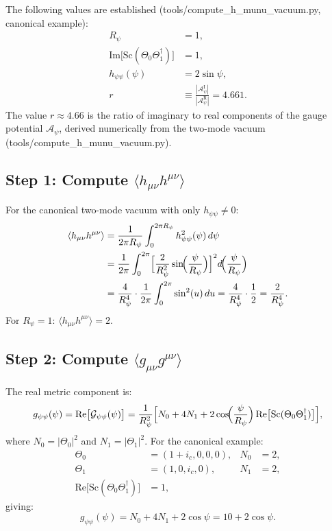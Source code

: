 \documentclass[11pt,a4paper]{article}
\theoremstyle{remark}
\begin{document}
The following values are established (tools/compute\_h\_munu\_vacuum.py, canonical example):
\begin{align}
  R_\psi &= 1, \label{eq:Rpsi_value}\\
  \mathrm{Im}\bigl[\mathrm{Sc}(\Theta_0\Theta_1^\dagger)\bigr] &= 1, \label{eq:sc_im_value}\\
  h_{\psi\psi}(\psi) &= 2\sin\psi, \label{eq:h_canonical}\\
  r &\equiv \frac{|\mathcal{A}^\mathrm{I}_\psi|}{|\mathcal{A}^\mathrm{R}_\psi|} = 4.661. \label{eq:r_value}
\end{align}
The value $r \approx 4.66$ is the ratio of imaginary to real components of the gauge potential
$\mathcal{A}_\psi$, derived numerically from the two-mode vacuum (tools/compute\_h\_munu\_vacuum.py).

\subsection{Step 1: Compute \texorpdfstring{$\langle h_{\mu\nu}h^{\mu\nu}\rangle$}{<h h>}}

For the canonical two-mode vacuum with only $h_{\psi\psi} \neq 0$:
\begin{align}
  \langle h_{\mu\nu}h^{\mu\nu}\rangle
    &= \frac{1}{2\pi R_\psi}\int_0^{2\pi R_\psi}
       h_{\psi\psi}^2(\psi)\,d\psi \notag\\
    &= \frac{1}{2\pi}\int_0^{2\pi}
       \Bigl[\frac{2}{R_\psi^2}\sin\!\Bigl(\frac{\psi}{R_\psi}\Bigr)\Bigr]^2
       d\!\Bigl(\frac{\psi}{R_\psi}\Bigr) \notag\\
    &= \frac{4}{R_\psi^4}\cdot\frac{1}{2\pi}\int_0^{2\pi}\sin^2(u)\,du
    = \frac{4}{R_\psi^4}\cdot\frac{1}{2}
    = \frac{2}{R_\psi^4}.
  \label{eq:hh_result}
\end{align}
For $R_\psi = 1$: $\langle h_{\mu\nu}h^{\mu\nu}\rangle = 2$.

\subsection{Step 2: Compute \texorpdfstring{$\langle g_{\mu\nu}g^{\mu\nu}\rangle$}{<g g>}}

The real metric component is:
\begin{equation}
  g_{\psi\psi}(\psi) = \mathrm{Re}\bigl[\mathcal{G}_{\psi\psi}(\psi)\bigr]
    = \frac{1}{R_\psi^2}\Bigl[N_0 + 4N_1 + 2\cos\!\Bigl(\frac{\psi}{R_\psi}\Bigr)
      \,\mathrm{Re}\bigl[\mathrm{Sc}(\Theta_0\Theta_1^\dagger)\bigr]\Bigr],
  \label{eq:g_psi_psi}
\end{equation}
where $N_0 = |\Theta_0|^2$ and $N_1 = |\Theta_1|^2$. For the canonical example:
\begin{align}
  \Theta_0 &= (1+i_c, 0, 0, 0), & N_0 &= 2, \label{eq:theta0_norm}\\
  \Theta_1 &= (1, 0, i_c, 0),   & N_1 &= 2, \label{eq:theta1_norm}\\
  \mathrm{Re}\bigl[\mathrm{Sc}(\Theta_0\Theta_1^\dagger)\bigr] &= 1, \label{eq:sc_re_value}
\end{align}
giving:
\begin{equation}
  g_{\psi\psi}(\psi) = N_0 + 4N_1 + 2\cos\psi = 10 + 2\cos\psi.
  \label{eq:g_canonical}
\end{equation}
\end{document}
